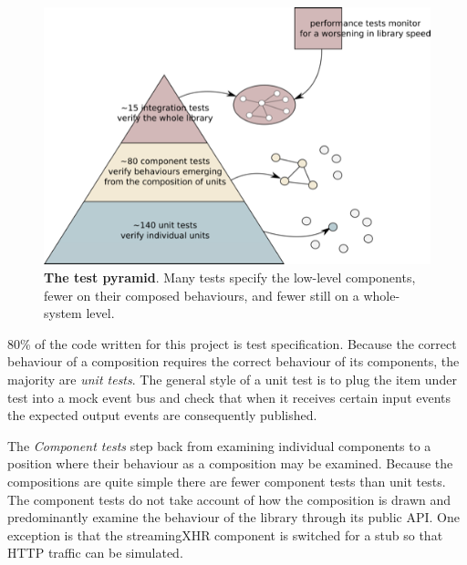 \documentclass[12pt, ]{article}
\makeatletter
\def\maxwidth{\ifdim\Gin@nat@width>\linewidth\linewidth
\else\Gin@nat@width\fi}
\let\Oldincludegraphics\includegraphics
\renewcommand{\includegraphics}[1]{\Oldincludegraphics[width=\maxwidth]{#1}}
\makeatother
\begin{document}
\begin{figure}[htbp]
\centering
\includegraphics{images/testPyramid.png}
\caption{\textbf{The test pyramid}. Many tests specify the low-level
components, fewer on their composed behaviours, and fewer still on a
whole-system level. \label{testpyramid}}
\end{figure}

80\% of the code written for this project is test specification. Because
the correct behaviour of a composition requires the correct behaviour of
its components, the majority are \emph{unit tests}. The general style of
a unit test is to plug the item under test into a mock event bus and
check that when it receives certain input events the expected output
events are consequently published.

The \emph{Component tests} step back from examining individual
components to a position where their behaviour as a composition may be
examined. Because the compositions are quite simple there are fewer
component tests than unit tests. The component tests do not take account
of how the composition is drawn and predominantly examine the behaviour
of the library through its public API. One exception is that the
streamingXHR component is switched for a stub so that HTTP traffic can
be simulated.
\end{document}
